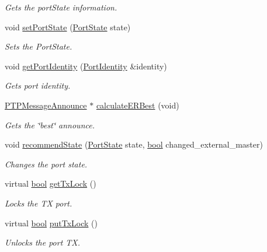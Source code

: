 \begin{DoxyCompactItemize}
\begin{DoxyCompactList}\small\item\em Gets the port\+State information. \end{DoxyCompactList}\item 
void \hyperlink{class_common_port_a8e4a7a3f199cde3540ed0d1ab10386e5}{set\+Port\+State} (\hyperlink{ptptypes_8hpp_a679431f1afc75d7bb9e972c022e53672}{Port\+State} state)
\begin{DoxyCompactList}\small\item\em Sets the Port\+State. \end{DoxyCompactList}\item 
void \hyperlink{class_common_port_a563117781330d95f1c6aa43837b7e4ed}{get\+Port\+Identity} (\hyperlink{class_port_identity}{Port\+Identity} \&identity)
\begin{DoxyCompactList}\small\item\em Gets port identity. \end{DoxyCompactList}\item 
\hyperlink{class_p_t_p_message_announce}{P\+T\+P\+Message\+Announce} $\ast$ \hyperlink{class_common_port_a6951410ed8e6a5ef44a028ef0a50cdeb}{calculate\+E\+R\+Best} (void)
\begin{DoxyCompactList}\small\item\em Gets the \char`\"{}best\char`\"{} announce. \end{DoxyCompactList}\item 
void \hyperlink{class_common_port_aa7588da5b66a33afeeda586e6abd334a}{recommend\+State} (\hyperlink{ptptypes_8hpp_a679431f1afc75d7bb9e972c022e53672}{Port\+State} state, \hyperlink{avb__gptp_8h_af6a258d8f3ee5206d682d799316314b1}{bool} changed\+\_\+external\+\_\+master)
\begin{DoxyCompactList}\small\item\em Changes the port state. \end{DoxyCompactList}\item 
virtual \hyperlink{avb__gptp_8h_af6a258d8f3ee5206d682d799316314b1}{bool} \hyperlink{class_common_port_a23336e7542011a26a61bdbd81bffe360}{get\+Tx\+Lock} ()
\begin{DoxyCompactList}\small\item\em Locks the TX port. \end{DoxyCompactList}\item 
virtual \hyperlink{avb__gptp_8h_af6a258d8f3ee5206d682d799316314b1}{bool} \hyperlink{class_common_port_abd9f9f0cb1265dc44a7e4846b7a1dc32}{put\+Tx\+Lock} ()
\begin{DoxyCompactList}\small\item\em Unlocks the port TX. \end{DoxyCompactList}\item 

\end{DoxyCompactItemize}
